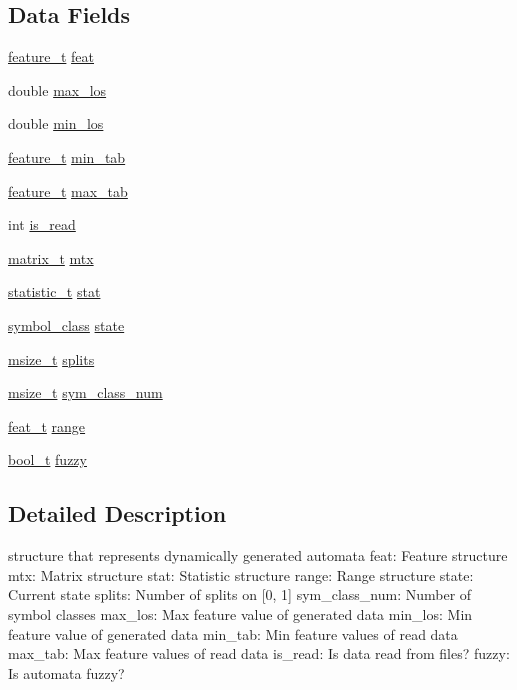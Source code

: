 \subsection*{Data Fields}
\begin{DoxyCompactItemize}
\item 
\hyperlink{structfeature__t}{feature\-\_\-t} \hyperlink{structautomata__t_aea937bcdfee70c1a1c33ebdd8abe22e4}{feat}
\item 
double \hyperlink{structautomata__t_ac1b32f1fedaa18ce4660e0c861d02499}{max\-\_\-los}
\item 
double \hyperlink{structautomata__t_a1c154215cdc0a2385e5ef4d638b90d7f}{min\-\_\-los}
\item 
\hyperlink{structfeature__t}{feature\-\_\-t} \hyperlink{structautomata__t_a42a70ea18f8540b5b62c425a51a716ca}{min\-\_\-tab}
\item 
\hyperlink{structfeature__t}{feature\-\_\-t} \hyperlink{structautomata__t_a6f76cc86cd6b6a69a21293f071391122}{max\-\_\-tab}
\item 
int \hyperlink{structautomata__t_a2d180cfe5698f6f9999b03cebaf83fcd}{is\-\_\-read}
\item 
\hyperlink{structmatrix__t}{matrix\-\_\-t} \hyperlink{structautomata__t_ad622b3580c94fcb06420e0d67dccfa3d}{mtx}
\item 
\hyperlink{structstatistic__t}{statistic\-\_\-t} \hyperlink{structautomata__t_ab202220b21f1095ec7837e4c14b0e9ed}{stat}
\item 
\hyperlink{types_8h_ac2a93159315d50befc9dd047d7de19a3}{symbol\-\_\-class} \hyperlink{structautomata__t_a967887d248745296590c426dd1046cea}{state}
\item 
\hyperlink{types_8h_a4717ab46b712567c1482ad0f5b910027}{msize\-\_\-t} \hyperlink{structautomata__t_a419b230963c5665dfe3b183ebf656708}{splits}
\item 
\hyperlink{types_8h_a4717ab46b712567c1482ad0f5b910027}{msize\-\_\-t} \hyperlink{structautomata__t_af7d9c374fd308653e15298ed62c36d59}{sym\-\_\-class\-\_\-num}
\item 
\hyperlink{types_8h_a9052d9742e283c5c2169b5b06f8245f0}{feat\-\_\-t} \hyperlink{structautomata__t_afcdd7f850b7d570e79cb82885fd973d1}{range}
\item 
\hyperlink{types_8h_a57c3b7201116536b822f0f8520aa99c7}{bool\-\_\-t} \hyperlink{structautomata__t_aeb015ceca00323d9a3ef30c7cb219246}{fuzzy}
\end{DoxyCompactItemize}


\subsection{Detailed Description}
structure that represents dynamically generated automata feat\-: Feature structure mtx\-: Matrix structure stat\-: Statistic structure range\-: Range structure state\-: Current state splits\-: Number of splits on \mbox{[}0, 1\mbox{]} sym\-\_\-class\-\_\-num\-: Number of symbol classes max\-\_\-los\-: Max feature value of generated data min\-\_\-los\-: Min feature value of generated data min\-\_\-tab\-: Min feature values of read data max\-\_\-tab\-: Max feature values of read data is\-\_\-read\-: Is data read from files? fuzzy\-: Is automata fuzzy? 

